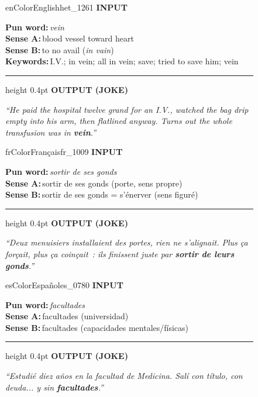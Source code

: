 \documentclass[]{ceurart}
\newcommand{\seclabel}[2]{{\scriptsize\sffamily\bfseries\textcolor{#1}{\MakeUppercase{#2}}}\par\vspace{1pt}}
\newcommand{\fieldname}[1]{{\scriptsize\textbf{#1:}}\,}
\begin{document}
\begin{figure}[ht]
\centering
\sffamily\footnotesize
\setlength{\baselineskip}{11pt}

\begin{minipage}[t]{0.327\linewidth}
\begin{punbox}{enColor}{English}{het\_1261}
\seclabel{enColor}{Input}
\fieldname{Pun word}\textit{vein}\\
\fieldname{Sense A}blood vessel toward heart\\
\fieldname{Sense B}to no avail (\textit{in vain})\\
\fieldname{Keywords}I.V.; in vein; all in vein; save; tried to save him; vein
\vspace{2pt}\hrule height 0.4pt
\vspace{2pt}
\seclabel{enColor}{Output (joke)}
\textit{``He paid the hospital twelve grand for an I.V., watched the bag drip empty into his arm, then flatlined anyway. Turns out the whole transfusion was in \textbf{\textcolor{enColor}{vein}}.''}
\end{punbox}
\end{minipage}\hfill
\begin{minipage}[t]{0.327\linewidth}
\begin{punbox}{frColor}{Fran\c{c}ais}{fr\_1009}
\seclabel{frColor}{Input}
\fieldname{Pun word}\textit{sortir de ses gonds}\\
\fieldname{Sense A}sortir de ses gonds (porte, sens propre)\\
\fieldname{Sense B}sortir de ses gonds = s'\'enerver (sens figur\'e)
\vspace{2pt}\hrule height 0.4pt
\vspace{2pt}
\seclabel{frColor}{Output (joke)}
\textit{``Deux menuisiers installaient des portes, rien ne s'alignait. Plus \c{c}a for\c{c}ait, plus \c{c}a coin\c{c}ait~: ils finissent juste par \textbf{\textcolor{frColor}{sortir de leurs gonds}}.''}
\end{punbox}
\end{minipage}\hfill
\begin{minipage}[t]{0.327\linewidth}
\begin{punbox}{esColor}{Espa\~nol}{es\_0780}
\seclabel{esColor}{Input}
\fieldname{Pun word}\textit{facultades}\\
\fieldname{Sense A}facultades (universidad)\\
\fieldname{Sense B}facultades (capacidades mentales/f\'isicas)
\vspace{2pt}\hrule height 0.4pt
\vspace{2pt}
\seclabel{esColor}{Output (joke)}
\textit{``Estudi\'e diez a\~nos en la facultad de Medicina. Sal\'i con t\'itulo, con deuda... y sin \textbf{\textcolor{esColor}{facultades}}.''}
\end{punbox}
\end{minipage}


\end{figure}
\end{document}
